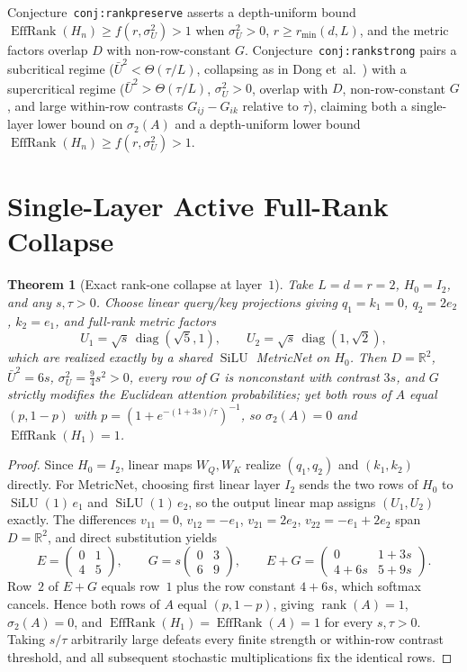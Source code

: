 \documentclass[11pt]{article}
\theoremstyle{plain}
\newtheorem{theorem}{Theorem}
\theoremstyle{definition}
\theoremstyle{remark}
\DeclareMathOperator{\EffRank}{EffRank}
\DeclareMathOperator{\diag}{diag}
\DeclareMathOperator{\rank}{rank}
\DeclareMathOperator{\SiLU}{SiLU}
\begin{document}
Conjecture~\texttt{conj:rankpreserve} asserts a depth-uniform bound $\EffRank(H_n) \ge f(r, \sigma_U^2) > 1$ when $\sigma_U^2 > 0$, $r \ge r_{\min}(d, L)$, and the metric factors overlap $D$ with non-row-constant $G$.
Conjecture~\texttt{conj:rankstrong} pairs a subcritical regime ($\bar U^2 < \Theta(\tau/L)$, collapsing as in Dong et~al.~\cite{dong2021attention}) with a supercritical regime ($\bar U^2 > \Theta(\tau/L)$, $\sigma_U^2 > 0$, overlap with $D$, non-row-constant $G$, and large within-row contrasts $G_{ij} - G_{ik}$ relative to $\tau$), claiming both a single-layer lower bound on $\sigma_2(A)$ and a depth-uniform lower bound $\EffRank(H_n) \ge f(r, \sigma_U^2) > 1$.

\section{Single-Layer Active Full-Rank Collapse}

\begin{theorem}[Exact rank-one collapse at layer~$1$]\label{thm:onelayer}
Take $L = d = r = 2$, $H_0 = I_2$, and any $s, \tau > 0$. Choose linear query/key projections giving $q_1 = k_1 = 0$, $q_2 = 2e_2$, $k_2 = e_1$, and full-rank metric factors
\[
U_1 = \sqrt{s}\,\diag(\sqrt{5}, 1), \qquad U_2 = \sqrt{s}\,\diag(1, \sqrt{2}),
\]
which are realized exactly by a shared $\SiLU$ MetricNet on $H_0$.
Then $D = \mathbb{R}^2$, $\bar U^2 = 6s$, $\sigma_U^2 = \frac{9}{4}s^2 > 0$, every row of $G$ is nonconstant with contrast $3s$, and $G$ strictly modifies the Euclidean attention probabilities; yet both rows of $A$ equal $(p, 1-p)$ with $p = (1 + e^{-(1+3s)/\tau})^{-1}$, so $\sigma_2(A) = 0$ and $\EffRank(H_1) = 1$.
\end{theorem}

\begin{proof}
Since $H_0 = I_2$, linear maps $W_Q, W_K$ realize $(q_1, q_2)$ and $(k_1, k_2)$ directly. For MetricNet, choosing first linear layer $I_2$ sends the two rows of $H_0$ to $\SiLU(1)\,e_1$ and $\SiLU(1)\,e_2$, so the output linear map assigns $(U_1, U_2)$ exactly.
The differences $v_{11} = 0$, $v_{12} = -e_1$, $v_{21} = 2e_2$, $v_{22} = -e_1 + 2e_2$ span $D = \mathbb{R}^2$, and direct substitution yields
\[
E = \begin{pmatrix} 0 & 1 \\ 4 & 5 \end{pmatrix}, \qquad
G = s \begin{pmatrix} 0 & 3 \\ 6 & 9 \end{pmatrix}, \qquad
E + G = \begin{pmatrix} 0 & 1 + 3s \\ 4 + 6s & 5 + 9s \end{pmatrix}.
\]
Row~$2$ of $E + G$ equals row~$1$ plus the row constant $4 + 6s$, which softmax cancels. Hence both rows of $A$ equal $(p, 1-p)$, giving $\rank(A) = 1$, $\sigma_2(A) = 0$, and $\EffRank(H_1) = \EffRank(A) = 1$ for every $s, \tau > 0$. Taking $s/\tau$ arbitrarily large defeats every finite strength or within-row contrast threshold, and all subsequent stochastic multiplications fix the identical rows.
\end{proof}
\end{document}

